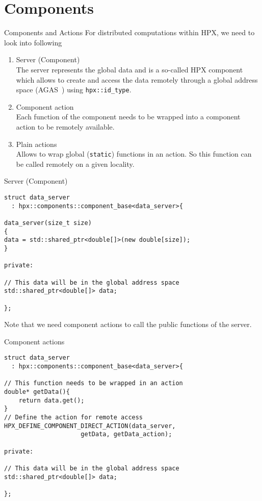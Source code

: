 \documentclass[12pt,t]{beamer}
\begin{document}
\section{Components}

\begin{frame}{Components and Actions}
For distributed computations within HPX, we need to look into following 

\begin{enumerate}
\item Server (Component) \\
The server represents the global data and is a so-called HPX component which allows to create and access the data remotely through a global address space (AGAS~\cite{kaiser2014hpx}) using \lstinline|hpx::id_type|.
\item Component action \\
Each function of the component needs to be wrapped into a component action to be remotely available. 
\item Plain actions \\
Allows to wrap global (\lstinline|static|) functions in an action. So this function can be called remotely on a given locality.
\end{enumerate} 

\end{frame}


\begin{frame}[fragile]{Server (Component)}
\begin{lstlisting}
struct data_server
  : hpx::components::component_base<data_server>{

data_server(size_t size)
{
data = std::shared_ptr<double[]>(new double[size]);
}

private:

// This data will be in the global address space 
std::shared_ptr<double[]> data;

};
\end{lstlisting}
Note that we need component actions to call the public functions of the server.
\end{frame}


\begin{frame}[fragile]{Component actions}
\begin{lstlisting}
struct data_server
  : hpx::components::component_base<data_server>{

// This function needs to be wrapped in an action
double* getData(){
    return data.get();
}
// Define the action for remote access
HPX_DEFINE_COMPONENT_DIRECT_ACTION(data_server,
                     getData, getData_action);

private:

// This data will be in the global address space 
std::shared_ptr<double[]> data;

};
\end{lstlisting}
\end{frame}
\end{document}
